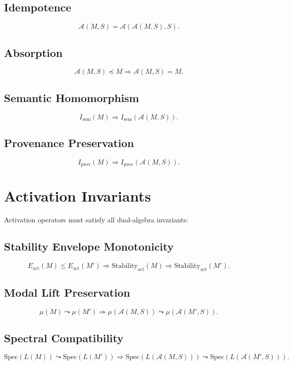 \documentclass[11pt]{article}
\begin{document}
\subsection{Idempotence}
\[
\mathcal{A}(M, S) = \mathcal{A}(\mathcal{A}(M, S), S).
\]

\subsection{Absorption}
\[
\mathcal{A}(M, S) \preceq M \Rightarrow \mathcal{A}(M, S) = M.
\]

\subsection{Semantic Homomorphism}
\[
I_{\mathrm{sem}}(M) \Rightarrow I_{\mathrm{sem}}(\mathcal{A}(M, S)).
\]

\subsection{Provenance Preservation}
\[
I_{\mathrm{prov}}(M) \Rightarrow I_{\mathrm{prov}}(\mathcal{A}(M, S)).
\]

\section{Activation Invariants}

Activation operators must satisfy all dual-algebra invariants:

\subsection{Stability Envelope Monotonicity}
\[
E_{\mathrm{act}}(M) \le E_{\mathrm{act}}(M')
  \Rightarrow \text{Stability}_{\mathrm{act}}(M)
  \Rightarrow \text{Stability}_{\mathrm{act}}(M').
\]

\subsection{Modal Lift Preservation}
\[
\mu(M) \leadsto \mu(M') \Rightarrow
  \mu(\mathcal{A}(M, S)) \leadsto \mu(\mathcal{A}(M', S)).
\]

\subsection{Spectral Compatibility}
\[
\mathrm{Spec}(L(M)) \leadsto \mathrm{Spec}(L(M'))
  \Rightarrow
  \mathrm{Spec}(L(\mathcal{A}(M, S)))
    \leadsto
  \mathrm{Spec}(L(\mathcal{A}(M', S))).
\]
\end{document}
